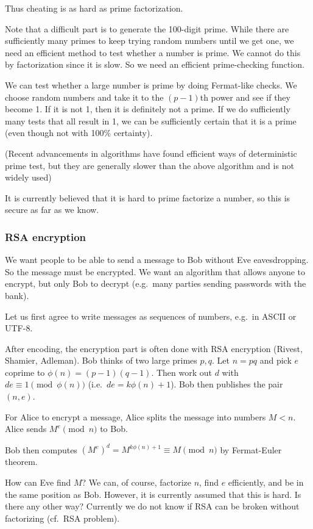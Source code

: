 \documentclass[a4paper]{article}
\begin{document}
Thus cheating is as hard as prime factorization.

Note that a difficult part is to generate the 100-digit prime. While there are sufficiently many primes to keep trying random numbers until we get one, we need an efficient method to test whether a number is prime. We cannot do this by factorization since it is slow. So we need an efficient prime-checking function.

We can test whether a large number is prime by doing Fermat-like checks. We choose random numbers and take it to the $(p - 1)$th power and see if they become 1. If it is not 1, then it is definitely not a prime. If we do sufficiently many tests that all result in 1, we can be sufficiently certain that it is a prime (even though not with 100\% certainty).

(Recent advancements in algorithms have found efficient ways of deterministic prime test, but they are generally slower than the above algorithm and is not widely used)

It is currently believed that it is hard to prime factorize a number, so this is secure as far as we know.
\subsubsection*{RSA encryption}

\begin{thm}
  We want people to be able to send a message to Bob without Eve eavesdropping. So the message must be encrypted. We want an algorithm that allows anyone to encrypt, but only Bob to decrypt (e.g.\ many parties sending passwords with the bank).

  Let us first agree to write messages as sequences of numbers, e.g.\ in ASCII or UTF-8.

  After encoding, the encryption part is often done with RSA encryption (Rivest, Shamier, Adleman). Bob thinks of two large primes $p, q$. Let $n = pq$ and pick $e$ coprime to $\phi(n) = (p - 1)(q - 1)$. Then work out $d$ with $de \equiv 1\pmod {\phi(n)}$ (i.e.\ $de = k\phi(n) + 1$). Bob then publishes the pair $(n, e)$.

  For Alice to encrypt a message, Alice splits the message into numbers $M < n$. Alice sends $M^e \pmod n$ to Bob.

  Bob then computes $(M^e)^d = M^{k\phi(n) + 1} \equiv M\pmod n$ by Fermat-Euler theorem.

  How can Eve find $M$? We can, of course, factorize $n$, find $e$ efficiently, and be in the same position as Bob. However, it is currently assumed that this is hard. Is there any other way? Currently we do not know if RSA can be broken without factorizing (cf.\ RSA problem).
\end{thm}
\end{document}
